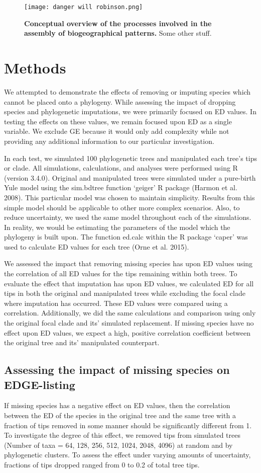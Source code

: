 \documentclass[12pt,english]{article}
\begin{document}
\begin{figure}
  \center
  \texttt{[image: danger will robinson.png]}
  \caption{\textbf{Conceptual overview of the processes involved in
      the assembly of biogeographical patterns.} Some other stuff.}
  \label{conceptual}
\end{figure}

\section*{Methods}
We attempted to demonstrate the effects of removing or imputing
species which cannot be placed onto a phylogeny. While assessing the
impact of dropping species and phylogenetic imputations, we were
primarily focused on ED values. In testing the effects on these
values, we remain focused upon ED as a single variable. We exclude GE
because it would only add complexity while not providing any
additional information to our particular investigation.

In each test, we simulated 100 phylogenetic trees and manipulated each
tree’s tips or clade. All simulations, calculations, and analyses were
performed using R (version 3.4.0). Original and manipulated trees were
simulated under a pure-birth Yule model using the sim.bdtree function
‘geiger’ R package (Harmon et al. 2008). This particular model was
chosen to maintain simplicity. Results from this simple model should
be applicable to other more complex scenarios. Also, to reduce
uncertainty, we used the same model throughout each of the
simulations. In reality, we would be estimating the parameters of the
model which the phylogeny is built upon. The function ed.calc within
the R package ‘caper’ was used to calculate ED values for each tree
(Orne et al. 2015).

We assessed the impact that removing missing species has upon ED
values using the correlation of all ED values for the tips remaining
within both trees. To evaluate the effect that imputation has upon ED
values, we calculated ED for all tips in both the original and
manipulated trees while excluding the focal clade where imputation has
occurred. These ED values were compared using a
correlation. Additionally, we did the same calculations and comparison
using only the original focal clade and its’ simulated replacement. If
missing species have no effect upon ED values, we expect a high,
positive correlation coefficient between the original tree and its’
manipulated counterpart.

\subsection*{Assessing the impact of missing species on EDGE-listing}
If missing species has a negative effect on ED values, then the
correlation between the ED of the species in the original tree and the
same tree with a fraction of tips removed in some manner should be
significantly different from 1. To investigate the degree of this
effect, we removed tips from simulated trees (Number of taxa = 64,
128, 256, 512, 1024, 2048, 4096) at random and by phylogenetic
clusters. To assess the effect under varying amounts of uncertainty,
fractions of tips dropped ranged from 0 to 0.2 of total tree tips.
\end{document}
